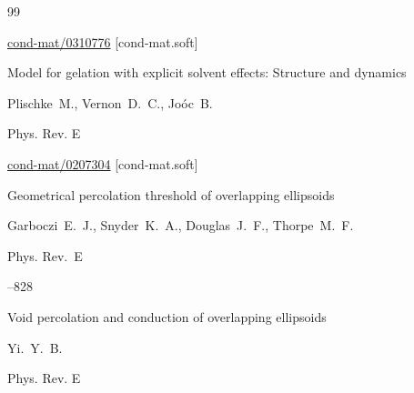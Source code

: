 {\begin{thebibliography}{99}





\arxiv \href{http://arxiv.org/abs/cond-mat/0310776}{cond-mat/0310776} [cond-mat.soft]







\paper Model for gelation with explicit solvent effects: Structure and dynamics

\by Plischke~M., Vernon~D.~C., Jo\'oc~B.

\jour Phys. Rev. E






\arxiv \href{http://arxiv.org/abs/cond-mat/0207304}{cond-mat/0207304} [cond-mat.soft]




\paper Geometrical percolation threshold of overlapping ellipsoids

\by Garboczi~E.~J., Snyder~K.~A., Douglas~J.~F.,  Thorpe~M.~F.

\jour Phys. Rev.~E




--828




\paper Void percolation and conduction of overlapping ellipsoids

\by Yi.~Y.~B.

\jour Phys. Rev. E













\end{thebibliography}}
